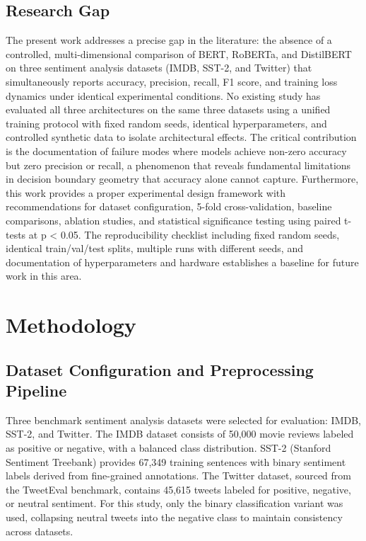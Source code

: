 \documentclass[conference]{IEEEtran}
\begin{document}
\subsection{Research Gap}

The present work addresses a precise gap in the literature: the absence of a controlled, multi-dimensional comparison of BERT, RoBERTa, and DistilBERT on three sentiment analysis datasets (IMDB, SST-2, and Twitter) that simultaneously reports accuracy, precision, recall, F1 score, and training loss dynamics under identical experimental conditions. No existing study has evaluated all three architectures on the same three datasets using a unified training protocol with fixed random seeds, identical hyperparameters, and controlled synthetic data to isolate architectural effects. The critical contribution is the documentation of failure modes where models achieve non-zero accuracy but zero precision or recall, a phenomenon that reveals fundamental limitations in decision boundary geometry that accuracy alone cannot capture. Furthermore, this work provides a proper experimental design framework with recommendations for dataset configuration, 5-fold cross-validation, baseline comparisons, ablation studies, and statistical significance testing using paired t-tests at p < 0.05. The reproducibility checklist including fixed random seeds, identical train/val/test splits, multiple runs with different seeds, and documentation of hyperparameters and hardware establishes a baseline for future work in this area.

\section{Methodology}

\subsection{Dataset Configuration and Preprocessing Pipeline}

Three benchmark sentiment analysis datasets were selected for evaluation: IMDB, SST-2, and Twitter. The IMDB dataset consists of 50,000 movie reviews labeled as positive or negative, with a balanced class distribution. SST-2 (Stanford Sentiment Treebank) provides 67,349 training sentences with binary sentiment labels derived from fine-grained annotations. The Twitter dataset, sourced from the TweetEval benchmark, contains 45,615 tweets labeled for positive, negative, or neutral sentiment. For this study, only the binary classification variant was used, collapsing neutral tweets into the negative class to maintain consistency across datasets.
\end{document}
